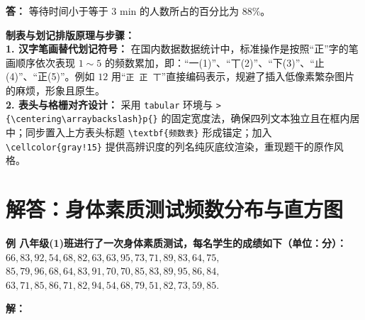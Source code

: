 \textbf{答：} 等待时间小于等于 $3\text{ min}$ 的人数所占的百分比为 $88\%$。

\vspace{0.6cm}

{\small\color{blue!70!black}
\textbf{制表与划记排版原理与步骤：}\\
\textbf{1. 汉字笔画替代划记符号：} 在国内数据数据统计中，标准操作是按照“正”字的笔画顺序依次表现 $1 \sim 5$ 的频数累加，即：“一(1)”、“丅(2)”、“下(3)”、“止(4)”、“正(5)”。例如 $12$ 用“\texttt{正~正~丅}”直接编码表示，规避了插入低像素繁杂图片的麻烦，形象且原生。\\
\textbf{2. 表头与格栅对齐设计：} 采用 \texttt{tabular} 环境与 \texttt{>\{\textbackslash centering\textbackslash arraybackslash\}p\{\}} 的固定宽度法，确保四列文本独立且在框内居中；同步置入上方表头标题 \texttt{\textbackslash textbf\{频数表\}} 形成锚定；加入 \texttt{\textbackslash cellcolor\{gray!15\}} 提供高辨识度的列名纯灰底纹渲染，重现题干的原作风格。
}

\newpage



\section{解答：身体素质测试频数分布与直方图}

\vspace{0.6cm}

\textbf{例 八年级(1)班进行了一次身体素质测试，每名学生的成绩如下（单位：分）：\\
$66, 83, 92, 54, 68, 82, 63, 63, 95, 73, 71, 89, 83, 64, 75,$ \\
$85, 79, 96, 68, 64, 83, 91, 70, 70, 85, 83, 89, 95, 86, 84,$ \\
$63, 71, 85, 86, 71, 82, 94, 54, 68, 79, 51, 82, 73, 59, 85.$}

\vspace{0.4cm}

\textbf{解：}

